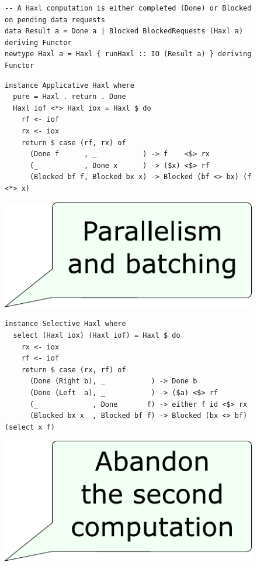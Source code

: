 \begin{figure}
\begin{verbatim}
-- A Haxl computation is either completed (Done) or Blocked on pending data requests
data Result a = Done a | Blocked BlockedRequests (Haxl a) deriving Functor
newtype Haxl a = Haxl { runHaxl :: IO (Result a) } deriving Functor
\end{verbatim}
\vspace{0mm}
\begin{verbatim}
instance Applicative Haxl where
  pure = Haxl . return . Done
  Haxl iof <*> Haxl iox = Haxl $ do
    rf <- iof
    rx <- iox
    return $ case (rf, rx) of
      (Done f      , _           ) -> f    <$> rx
      (_           , Done x      ) -> ($x) <$> rf
      (Blocked bf f, Blocked bx x) -> Blocked (bf <> bx) (f <*> x)
\end{verbatim}
\vspace{-13.5mm}\hspace{95mm}\includegraphics[scale=0.32]{fig/comment-haxl-applicative.pdf}
\vspace{3mm}
\begin{verbatim}
instance Selective Haxl where
  select (Haxl iox) (Haxl iof) = Haxl $ do
    rx <- iox
    rf <- iof
    return $ case (rx, rf) of
      (Done (Right b), _           ) -> Done b
      (Done (Left  a), _           ) -> ($a) <$> rf
      (_             , Done       f) -> either f id <$> rx
      (Blocked bx x  , Blocked bf f) -> Blocked (bx <> bf) (select x f)
\end{verbatim}
\vspace{-26mm}\hspace{31.5mm}\includegraphics[scale=0.32]{fig/comment-haxl-selective-1.pdf}

\end{figure}
